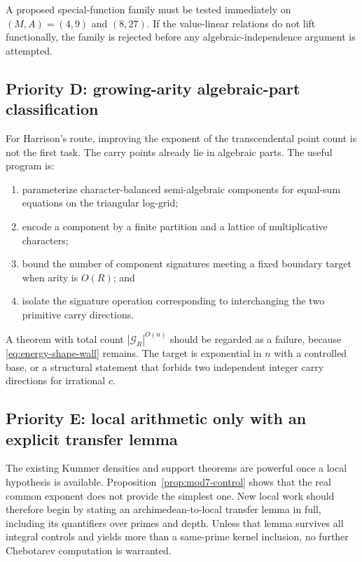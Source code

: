\documentclass[11pt,oneside]{article}
\theoremstyle{definition}
\theoremstyle{remark}
\newcommand{\cG}{\mathcal G}
\begin{document}
A proposed special-function family must be tested immediately on $(M,A)=(4,9)$ and $(8,27)$.
If the value-linear relations do not lift functionally, the family is rejected before any
algebraic-independence argument is attempted.

\subsection{Priority D: growing-arity algebraic-part classification}

For Harrison's route, improving the exponent of the transcendental point count is not the first
task.  The carry points already lie in algebraic parts.  The useful program is:

\begin{enumerate}
\item parameterize character-balanced semi-algebraic components for equal-sum equations on the
triangular log-grid;
\item encode a component by a finite partition and a lattice of multiplicative characters;
\item bound the number of component signatures meeting a fixed boundary target when arity is
$O(R)$; and
\item isolate the signature operation corresponding to interchanging the two primitive carry
directions.
\end{enumerate}

A theorem with total count $|\cG_R|^{O(n)}$ should be regarded as a failure, because
\eqref{eq:energy-shape-wall} remains.  The target is exponential in $n$ with a controlled base, or
a structural statement that forbids two independent integer carry directions for irrational
$c$.

\subsection{Priority E: local arithmetic only with an explicit transfer lemma}

The existing Kummer densities and support theorems are powerful once a local hypothesis is
available.  Proposition~\ref{prop:mod7-control} shows that the real common exponent does not provide
the simplest one.  New local work should therefore begin by stating an archimedean-to-local
transfer lemma in full, including its quantifiers over primes and depth.  Unless that lemma
survives all integral controls and yields more than a same-prime kernel inclusion, no further
Chebotarev computation is warranted.
\end{document}
